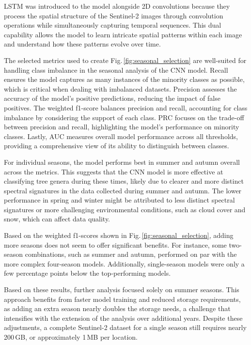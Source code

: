 LSTM was introduced to the model alongside 2D convolutions because they process the spatial structure of the Sentinel-2 images through convolution operations while simultaneously capturing temporal sequences. This dual capability allows the model to learn intricate spatial patterns within each image and understand how these patterns evolve over time.

The selected metrics used to create Fig.\,\ref{fig:seasonal_selection} are well-suited for handling class imbalance in the seasonal analysis of the CNN model. Recall ensures the model captures as many instances of the minority classes as possible, which is critical when dealing with imbalanced datasets. Precision assesses the accuracy of the model's positive predictions, reducing the impact of false positives. The weighted f1-score balances precision and recall, accounting for class imbalance by considering the support of each class. PRC focuses on the trade-off between precision and recall, highlighting the model's performance on minority classes. Lastly, AUC measures overall model performance across all thresholds, providing a comprehensive view of its ability to distinguish between classes.

For individual seasons, the model performs best in summer and autumn overall across the metrics. This suggests that the CNN model is more effective at classifying tree genera during these times, likely due to clearer and more distinct spectral signatures in the data collected during summer and autumn. The lower performance in spring and winter might be attributed to less distinct spectral signatures or more challenging environmental conditions, such as cloud cover and snow, which can affect data quality.

Based on the weighted f1-scores shown in Fig.\,\ref{fig:seasonal_selection}, adding more seasons does not seem to offer significant benefits. For instance, some two-season combinations, such as summer and autumn, performed on par with the more complex four-season models. Additionally, single-season models were only a few percentage points below the top-performing models.

Based on these results, further analysis focused solely on summer seasons. This approach benefits from faster model training and reduced storage requirements, as adding an extra season nearly doubles the storage needs, a challenge that intensifies with the extension of the analysis over additional years. Despite these adjustments, a complete Sentinel-2 dataset for a single season still requires nearly 200\,GB, or approximately 1\,MB per location.


